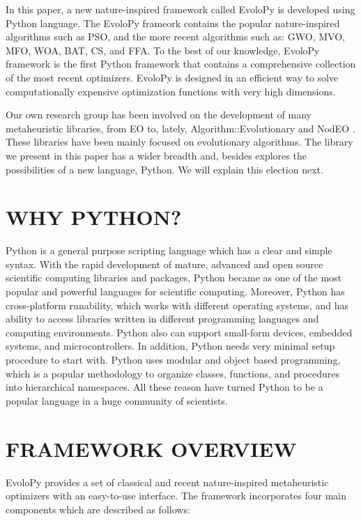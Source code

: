 \documentclass[a4paper,twoside]{article}
\begin{document}
In this paper, a new nature-inspired framework called EvoloPy is developed using Python language. The EvoloPy frameork contains the popular nature-inspired algorithms such as PSO, and the more recent algorithms such as: GWO, MVO, MFO, WOA, BAT, CS, and FFA. To the best of our knowledge, EvoloPy framework is the first Python framework that contains a comprehensive collection of the most recent optimizers. EvoloPy is designed in an efficient way to solve computationally expensive optimization functions with very high dimensions. 

Our own research group has been involved on the development of many
metaheuristic libraries, from EO \cite{EO:FEA2000} to, lately, {\sf
  Algorithm::Evolutionary} \cite{ae09} and NodEO
\cite{nodeo2014}. These libraries have been mainly focused on
evolutionary algorithms. The library we present in this paper has a
wider breadth and, besides explores the possibilities of a new
language, Python. We will explain this election next. 


\section{\uppercase{Why Python?}}

Python is a general purpose scripting language which has a clear and simple syntax. With the rapid development of mature, advanced  and open source scientific computing libraries and packages, Python became as one of the most popular and powerful languages for scientific computing.
Moreover, Python has cross-platform runability, which works with different operating systems, and has ability to access libraries written in different programming languages and computing environments. Python also can support small-form devices, embedded systems, and microcontrollers. In addition, Python needs very minimal setup procedure to start with. Python uses modular and object based programming, which is a popular methodology to organize classes, functions, and procedures into hierarchical namespaces. All these reason have turned Python to be a popular language in a huge community of scientists. 

\section{\uppercase{Framework Overview}}

EvoloPy provides a set of classical and recent nature-inspired metaheuristic optimizers with an easy-to-use interface. The framework incorporates four main components which are described as follows: 
\end{document}
